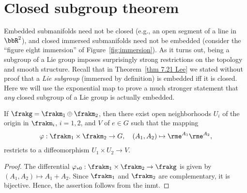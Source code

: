 \section{Closed subgroup theorem}


Embedded submanifolds need not be closed (e.g., an open segment of a line in $\bbR^2$), and closed immersed submanifolds need not be embedded (consider the ``figure eight immersion'' of Figure~\ref{fig:immersion}). As it turns out, being a subgroup of a Lie group imposes surprisingly strong restrictions on the topology and smooth structure. Recall that in Theorem~\ref{thm 7.21 Lee} we stated without proof that a \emph{Lie subgroup} (immersed by definition) is embedded iff it is closed. Here we will use the exponential map to prove a much stronger statement that \emph{any} closed subgroup of a Lie group is actually embedded.


\begin{lem}[{{\cite[Lem.~5.6.7]{RS1}}}]\label{lem 5.6.7 RS1}
    If $\frakg=\frakm_1\oplus\frakm_2$, then there exist open neighborhoods $U_i$ of the origin in $\frakm_i$, $i=1,2$, and $V$ of $e\in G$ such that the mapping
    \[\varphi:\frakm_1\times\frakm_2\to G,\quad (A_1,A_2)\mapsto \rme^{A_1}\rme^{A_2},\]
    restricts to a diffeomorphism $U_1\times U_2\to V$.
\end{lem}
\begin{proof}
    The differential $\varphi_{\ast 0}:\frakm_1\times\frakm_2\to\frakg$ is given by $(A_1,A_2)\mapsto A_1+A_2$. Since $\frakm_1$ and $\frakm_2$ are complementary, it is bijective. Hence, the assertion follows from the \gls{inmt}.
\end{proof}



